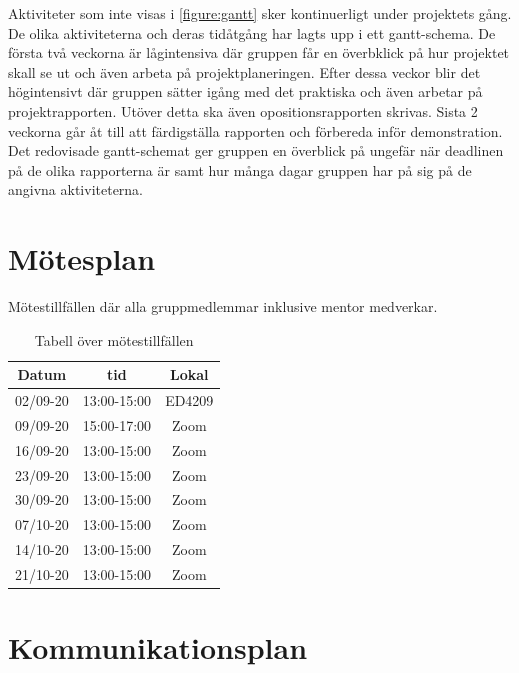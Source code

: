 \documentclass[a4paper]{article}
\begin{document}
Aktiviteter som inte visas i \ref{figure:gantt} sker kontinuerligt under projektets gång. De olika aktiviteterna och deras tidåtgång har lagts upp i ett gantt-schema. De första två veckorna är lågintensiva där gruppen får en överbklick på hur projektet skall se ut och även arbeta på projektplaneringen. Efter dessa veckor blir det högintensivt där gruppen sätter igång med det praktiska och även arbetar på projektrapporten. Utöver detta ska även opositionsrapporten skrivas. Sista 2 veckorna går åt till att färdigställa rapporten och förbereda inför demonstration. Det redovisade gantt-schemat ger gruppen en överblick på ungefär när deadlinen på de olika rapporterna är samt hur många dagar gruppen har på sig på de angivna aktiviteterna.

\section{Mötesplan}

Mötestillfällen där alla gruppmedlemmar inklusive mentor medverkar.

\begin{table}[H]
    \begin{center}
        \begin{tabular}{ |c|c|c| }\hline
            Datum & tid & Lokal \\\hline\hline
            02/09-20 & 13:00-15:00 & ED4209 \\\hline
            09/09-20 & 15:00-17:00 & Zoom \\\hline
            16/09-20 & 13:00-15:00 & Zoom \\\hline
            23/09-20 & 13:00-15:00 & Zoom \\\hline
            30/09-20 & 13:00-15:00 & Zoom \\\hline
            07/10-20 & 13:00-15:00 & Zoom \\\hline
            14/10-20 & 13:00-15:00 & Zoom \\\hline
            21/10-20 & 13:00-15:00 & Zoom \\\hline
        \end{tabular}
        \caption{Tabell över mötestillfällen}
        \label{table:motesplan}
    \end{center}
\end{table}

\section{Kommunikationsplan}
\end{document}
